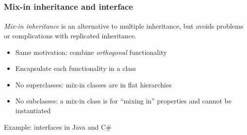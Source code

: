\documentclass{beamer}
\begin{document}
\begin{frame}[fragile]
\frametitle{Mix-in inheritance and interface}
\framesubtitle{}
\textit{Mix-in inheritance} is an alternative to multiple inheritance, but
avoids problems or complications with replicated inheritance.

\begin{itemize}
\item Same motivation: combine \textit{orthogonal} functionality
\item Encapsulate each functionality in a class
\item No superclasses: mix-in classes are in
flat hierarchies 
\item No subclasses:  a mix-in class is for
``mixing in'' properties and cannot be instantiated
\end{itemize}

Example: interfaces in Java and C\#
\end{frame}
\end{document}
